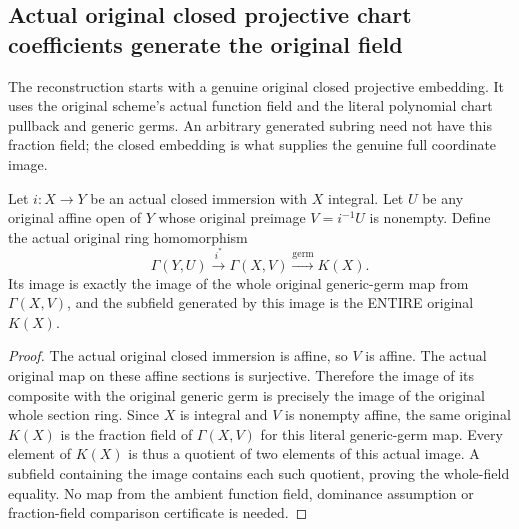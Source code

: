 \subsection{Actual original closed projective chart coefficients generate the original field}
The reconstruction starts with a genuine original closed projective
embedding. It uses the original scheme's actual function field and the
literal polynomial chart pullback and generic germs. An arbitrary
generated subring need not have this fraction field; the closed embedding
is what supplies the genuine full coordinate image.

\begin{theorem}
\label{thm:seven-original-closed-chart-field-generation-route}
\leanok
{}
Let $i:X\to Y$ be an actual closed immersion with $X$ integral. Let $U$
be any original affine open of $Y$ whose original preimage $V=i^{-1}U$
is nonempty. Define the actual original ring homomorphism
\[
 \Gamma(Y,U)\xrightarrow{i^*}\Gamma(X,V)
   \xrightarrow{\mathrm{germ}}K(X).
\]
Its image is exactly the image of the whole original generic-germ map
from $\Gamma(X,V)$, and the subfield generated by this image is the
ENTIRE original $K(X)$.
\end{theorem}
\begin{proof}
The actual original closed immersion is affine, so $V$ is affine.
The actual original map on these affine sections is surjective.
Therefore the image of its composite with the original generic germ
is precisely the image of the original whole section ring. Since $X$
is integral and $V$ is nonempty affine, the same original $K(X)$ is
the fraction field of $\Gamma(X,V)$ for this literal generic-germ map.
Every element of $K(X)$ is thus a quotient of two elements of this
actual image. A subfield containing the image contains each such
quotient, proving the whole-field equality. No map from the ambient
function field, dominance assumption or fraction-field comparison
certificate is needed.
\end{proof}

